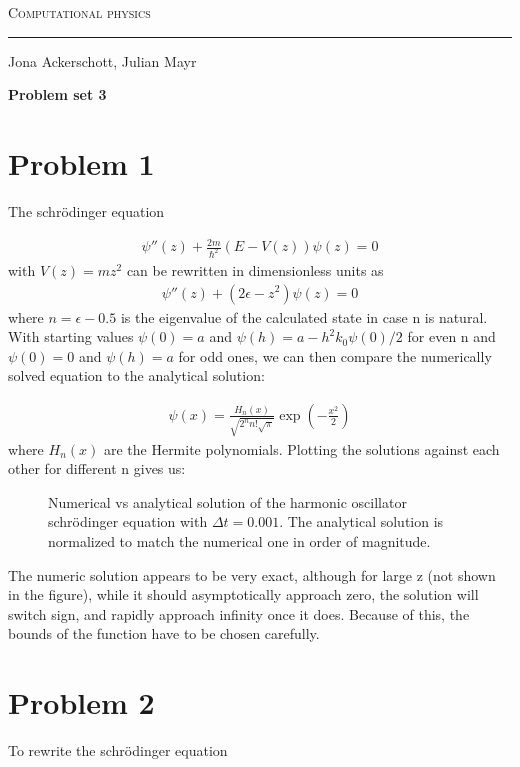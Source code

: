 \documentclass[12pt, a4paper]{article}
\begin{document}
  \centerline{\Huge\scshape Computational physics}
  \vspace*{0.5cm}
  \hrule
  \vspace*{0.5cm}
  \centerline{Jona Ackerschott, Julian Mayr}
  \vspace*{1cm}
  \centerline{\Large\bfseries Problem set 3}
  \vspace*{0.5cm}

  \section*{Problem 1}
  The schrödinger equation
  
  \begin{align} 
  \psi''(z) + \frac{2 m}{\hbar^2} (E - V(z)) \psi(z) = 0
  \end{align}
  \noindent
  with $V(z)=mz^2$ can be rewritten in dimensionless units as
  \begin{align} 
  \psi''(z) + (2\epsilon-z^2) \psi(z) = 0
  \end{align}
  \noindent
  where $n=\epsilon-0.5$ is the eigenvalue of the calculated state in case n is natural. With starting values $\psi(0)=a$ and $\psi(h)=a-h^2k_0\psi(0)/2$ for even n and $\psi(0)=0$ and $\psi(h)=a$ for odd ones, we can then compare the numerically solved equation to the analytical solution:
  
  \begin{align}
  \psi(x)=\frac{H_n(x)}{\sqrt{2^nn!\sqrt{\pi}}}\exp\left(-\frac{x^2}{2}\right)
  \end{align}
  \noindent
  where $H_n(x)$ are the Hermite polynomials. Plotting the solutions against each other for different n gives us:\\
    
  \begin{figure}
  	\scalebox{0.7}{
  		}
  	\caption{Numerical vs analytical solution of the harmonic oscillator schrödinger equation with $\Delta t=0.001$. The analytical solution is normalized to match the numerical one in order of magnitude.}
  	\label{fig1}
  \end{figure}
  \newpage
  
  
  The numeric solution appears to be very exact, although for large z (not shown in the figure), while it should asymptotically approach zero, the solution will switch sign, and rapidly approach infinity once it does. Because of this, the bounds of the function have to be chosen carefully.
  \section*{Problem 2}
  To rewrite the schrödinger equation
\end{document}
